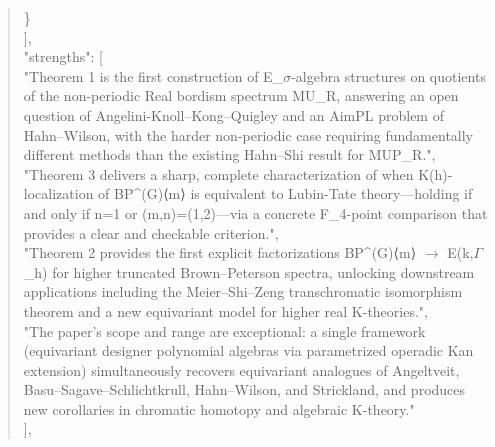 \documentclass[11pt]{article}
\begin{document}
\begin{quote}
    \}\\
  ],\\
  "strengths": [\\
    "Theorem 1 is the first construction of E\_\ensuremath{\sigma}-algebra structures on quotients of the non-periodic Real bordism spectrum MU\_R, answering an open question of Angelini-Knoll--Kong--Quigley and an AimPL problem of Hahn--Wilson, with the harder non-periodic case requiring fundamentally different methods than the existing Hahn--Shi result for MUP\_R.",\\
    "Theorem 3 delivers a sharp, complete characterization of when K(h)-localization of BP\^{}(G)⟨m⟩ is equivalent to Lubin-Tate theory---holding if and only if n=1 or (m,n)=(1,2)---via a concrete F\_4-point comparison that provides a clear and checkable criterion.",\\
    "Theorem 2 provides the first explicit factorizations BP\^{}(G)⟨m⟩ \ensuremath{\to} E(k,\ensuremath{\Gamma}\_h) for higher truncated Brown--Peterson spectra, unlocking downstream applications including the Meier--Shi--Zeng transchromatic isomorphism theorem and a new equivariant model for higher real K-theories.",\\
    "The paper's scope and range are exceptional: a single framework (equivariant designer polynomial algebras via parametrized operadic Kan extension) simultaneously recovers equivariant analogues of Angeltveit, Basu--Sagave--Schlichtkrull, Hahn--Wilson, and Strickland, and produces new corollaries in chromatic homotopy and algebraic K-theory."\\
  ],\\

\end{quote}
\end{document}
